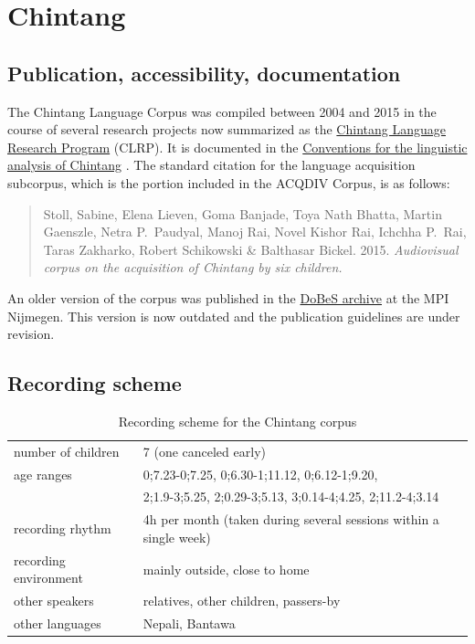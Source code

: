 \documentclass[a4paper, 11pt]{book}
\begin{document}
\section{Chintang}
\label{sec:Chintang}

\subsection{Publication, accessibility, documentation}
The Chintang Language Corpus \citep{Stoll_etal2015b} was compiled between 2004 and 2015 in the course of several research projects now summarized as the \href{http://www.clrp.uzh.ch}{Chintang Language Research Program} (CLRP). It is documented in the \href{http://spwarran.uzh.ch/chintangwiki/index.php/Conventions_for_the_linguistic_analysis_of_Chintang}{Conventions for the linguistic analysis of Chintang} \citep{Schikowski2015a}. The standard citation for the language acquisition subcorpus, which is the portion included in the ACQDIV Corpus, is as follows: 

\begin{quote}
	Stoll, Sabine, Elena Lieven, Goma Banjade, Toya Nath Bhatta, Martin Gaenszle, Netra P.\ Paudyal, Manoj Rai, Novel Kishor Rai, 
	Ichchha P.\ Rai, Taras Zakharko, Robert Schikowski \& Balthasar Bickel. 2015. \emph{Audiovisual corpus on the acquisition of Chintang by six children.} %
\end{quote}

An older version of the corpus was published in the \href{http://dobes.mpi.nl/}{DoBeS archive} at the MPI Nijmegen. This version is now outdated and the publication guidelines are under revision. 


\subsection{Recording scheme}

\begin{table}[ht]
	\centering
	\begin{tabular}{ll}
		\toprule
		number of children 	& 7 (one canceled early) \\
		age ranges 			& 0;7.23-0;7.25, 0;6.30-1;11.12, 0;6.12-1;9.20, \\
							& 2;1.9-3;5.25, 2;0.29-3;5.13, 3;0.14-4;4.25, 2;11.2-4;3.14 \\
		recording rhythm 	& 4h per month (taken during several sessions within a single week) \\
		recording environment & mainly outside, close to home \\
		other speakers		& relatives, other children, passers-by \\
		other languages		& Nepali, Bantawa \\
		\bottomrule		
	\end{tabular}
	\caption{Recording scheme for the Chintang corpus}
	\label{tab:Chintang recording scheme}
\end{table}
\end{document}

